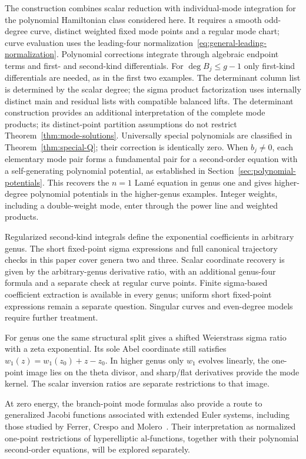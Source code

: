 \documentclass[11pt]{article}
\begin{document}
The construction combines scalar reduction with individual-mode integration for the polynomial Hamiltonian class considered here. It requires a smooth odd-degree curve, distinct weighted fixed mode points and a regular mode chart; curve evaluation uses the leading-four normalization~\eqref{eq:general-leading-normalization}. Polynomial corrections integrate through algebraic endpoint terms and first- and second-kind differentials. For $\deg B_j\le g-1$ only first-kind differentials are needed, as in the first two examples. The determinant column list is determined by the scalar degree; the sigma product factorization uses internally distinct main and residual lists with compatible balanced lifts. The determinant construction provides an additional interpretation of the complete mode products; its distinct-point partition assumptions do not restrict Theorem~\ref{thm:mode-solutions}. Universally special polynomials are classified in Theorem~\ref{thm:special-Q}; their correction is identically zero. When $b_j\ne0$, each elementary mode pair forms a fundamental pair for a second-order equation with a self-generating polynomial potential, as established in Section~\ref{sec:polynomial-potentials}. This recovers the $n=1$ Lam\'e equation in genus one and gives higher-degree polynomial potentials in the higher-genus examples. Integer weights, including a double-weight mode, enter through the power line and weighted products.

Regularized second-kind integrals define the exponential coefficients in arbitrary genus. The short fixed-point sigma expressions and full canonical trajectory checks in this paper cover genera two and three. Scalar coordinate recovery is given by the arbitrary-genus derivative ratio, with an additional genus-four formula and a separate check at regular curve points. Finite sigma-based coefficient extraction is available in every genus; uniform short fixed-point expressions remain a separate question. Singular curves and even-degree models require further treatment.

For genus one the same structural split gives a shifted Weierstrass sigma ratio with a zeta exponential. Its sole Abel coordinate still satisfies $w_1(z)=w_1(z_0)+z-z_0$. In higher genus only $w_1$ evolves linearly, the one-point image lies on the theta divisor, and sharp/flat derivatives provide the mode kernel. The scalar inversion ratios are separate restrictions to that image.

At zero energy, the branch-point mode formulas also provide a route to
generalized Jacobi functions associated with extended Euler systems,
including those studied by Ferrer, Crespo and Molero~\cite{ferrer-ees}.
Their interpretation as normalized one-point restrictions of hyperelliptic
$\mathrm{al}$-functions, together with their polynomial second-order
equations, will be explored separately.
\end{document}
